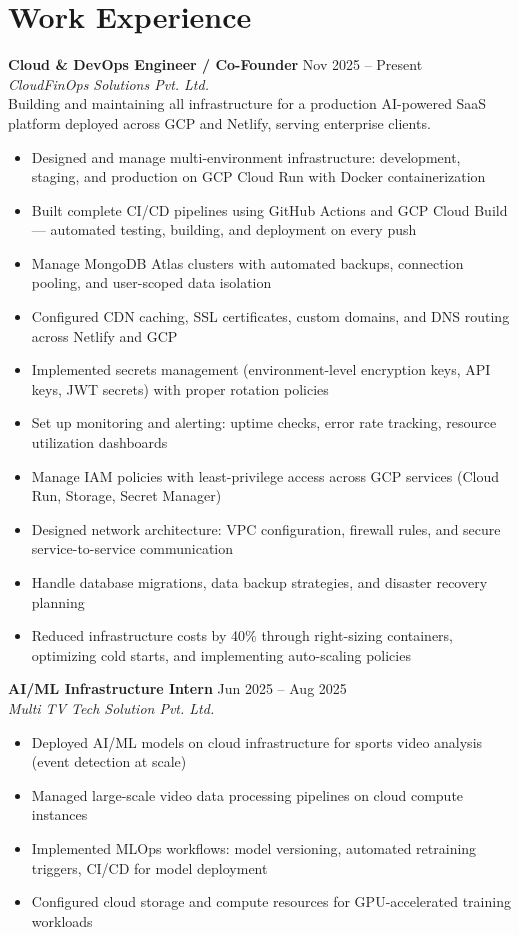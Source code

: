 \documentclass[a4paper,10pt]{article}
\begin{document}
\section{Work Experience}

\textbf{Cloud \& DevOps Engineer / Co-Founder} \hfill Nov 2025 -- Present \\
\textit{CloudFinOps Solutions Pvt. Ltd.} \\[2pt]
Building and maintaining all infrastructure for a production AI-powered SaaS platform deployed across GCP and Netlify, serving enterprise clients.
\begin{itemize}
    \item Designed and manage multi-environment infrastructure: development, staging, and production on GCP Cloud Run with Docker containerization
    \item Built complete CI/CD pipelines using GitHub Actions and GCP Cloud Build — automated testing, building, and deployment on every push
    \item Manage MongoDB Atlas clusters with automated backups, connection pooling, and user-scoped data isolation
    \item Configured CDN caching, SSL certificates, custom domains, and DNS routing across Netlify and GCP
    \item Implemented secrets management (environment-level encryption keys, API keys, JWT secrets) with proper rotation policies
    \item Set up monitoring and alerting: uptime checks, error rate tracking, resource utilization dashboards
    \item Manage IAM policies with least-privilege access across GCP services (Cloud Run, Storage, Secret Manager)
    \item Designed network architecture: VPC configuration, firewall rules, and secure service-to-service communication
    \item Handle database migrations, data backup strategies, and disaster recovery planning
    \item Reduced infrastructure costs by 40\% through right-sizing containers, optimizing cold starts, and implementing auto-scaling policies
\end{itemize}

\vspace{6pt}
\textbf{AI/ML Infrastructure Intern} \hfill Jun 2025 -- Aug 2025 \\
\textit{Multi TV Tech Solution Pvt. Ltd.} \\[2pt]
\begin{itemize}
    \item Deployed AI/ML models on cloud infrastructure for sports video analysis (event detection at scale)
    \item Managed large-scale video data processing pipelines on cloud compute instances
    \item Implemented MLOps workflows: model versioning, automated retraining triggers, CI/CD for model deployment
    \item Configured cloud storage and compute resources for GPU-accelerated training workloads
\end{itemize}
\end{document}
